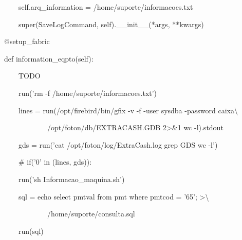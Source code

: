 {\ttfamily\color[rgb]{0.10980392,0.10980392,0.10980392}
    \ \ \ \ \ \ \ \ self.arq\_information = {\textquotedbl}/home/suporte/informacoes.txt{\textquotedbl}}


    \bigskip

{\ttfamily\color[rgb]{0.10980392,0.10980392,0.10980392}
    \ \ \ \ \ \ \ \ super(SaveLogCommand, self).\_\_init\_\_(*args, **kwargs)}


    \bigskip

{\ttfamily\color[rgb]{0.10980392,0.10980392,0.10980392}
    \ \ \ \ @setup\_fabric}

{\ttfamily\color[rgb]{0.10980392,0.10980392,0.10980392}
    \ \ \ \ def information\_eqpto(self):}

{\ttfamily\color[rgb]{0.10980392,0.10980392,0.10980392}
    \ \ \ \ \ \ \ \ {\textquotedbl}TODO{\textquotedbl}}

{\ttfamily\color[rgb]{0.10980392,0.10980392,0.10980392}
    \ \ \ \ \ \ \ \ run('rm -f /home/suporte/informacoes.txt')}

{\ttfamily\color[rgb]{0.10980392,0.10980392,0.10980392}
    \ \ \ \ \ \ \ \ lines = run({\textquotedbl}/opt/firebird/bin/gfix -v -f -user sysdba -password caixa{\textbackslash}}

            {\ttfamily\color[rgb]{0.10980392,0.10980392,0.10980392}
            \ \ \ \ \ \ \ \ \ \ \ \ \ \ \ \ /opt/foton/db/EXTRACASH.GDB 2{\textgreater}\&1 {\textbar} wc -l{\textquotedbl}).stdout}

{\ttfamily\color[rgb]{0.10980392,0.10980392,0.10980392}
    \ \ \ \ \ \ \ \ gds = run('cat /opt/foton/log/ExtraCash.log {\textbar}grep GDS {\textbar}wc -l')}

{\ttfamily\color[rgb]{0.10980392,0.10980392,0.10980392}
    \ \ \ \ \ \ \ \ \# if('0' in (lines, gds)):}

{\ttfamily\color[rgb]{0.10980392,0.10980392,0.10980392}
    \ \ \ \ \ \ \ \ run('sh Informacao\_maquina.sh')}


    \bigskip

{\ttfamily\color[rgb]{0.10980392,0.10980392,0.10980392}
    \ \ \ \ \ \ \ \ sql = {\textquotedbl}{\textquotedbl}{\textquotedbl}echo {\textquotedbl}select pmtval from pmt where
        pmtcod = '65';{\textquotedbl} {\textgreater}{\textbackslash}}

{\ttfamily\color[rgb]{0.10980392,0.10980392,0.10980392}
    \ \ \ \ \ \ \ \ \ \ \ \ \ \ \ \ /home/suporte/consulta.sql{\textquotedbl}{\textquotedbl}{\textquotedbl}}

{\ttfamily\color[rgb]{0.10980392,0.10980392,0.10980392}
    \ \ \ \ \ \ \ \ run(sql)}


